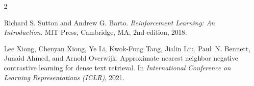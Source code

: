 \begin{thebibliography}{2}

Richard S. Sutton and Andrew G. Barto.
\newblock \emph{Reinforcement Learning: An Introduction}.
\newblock MIT Press, Cambridge, MA, 2nd edition, 2018.

Lee Xiong, Chenyan Xiong, Ye Li, Kwok-Fung Tang, Jialin Liu, Paul~N. Bennett, Junaid Ahmed, and Arnold Overwijk.
\newblock Approximate nearest neighbor negative contrastive learning for dense text retrieval.
\newblock In \emph{International Conference on Learning Representations (ICLR)}, 2021.

\end{thebibliography}
